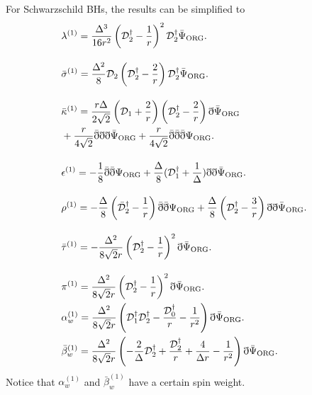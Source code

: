\documentclass[aps,prd,amsmath,floats,floatfix, twocolumn,
superscriptaddress,nofootinbib,showpacs]{revtex4-1}
\newcommand{\hertz}{\Psi_{\rm ORG}}
\newcommand{\hertzbar}{\bar{\Psi}_{\rm ORG}}
\begin{document}
For Schwarzschild BHs, the results can be simplified to
\begin{align}
    &\lambda^{(1)}= \frac{\Delta^3}{16r^2}\left(\mathcal{D}_2^\dagger -\frac{1}{r}\right)^2 \mathcal{D}_2^\dagger\hertzbar. \\[10pt]
    &\bar{\sigma}^{(1)}=\frac{\Delta^2}{8}\mathcal{D}_2\left(\mathcal{D}_2^\dagger -\frac{2}{r}\right) \mathcal{D}_2^\dagger\hertzbar. \\[10pt]
    &\bar{\kappa}^{(1)} =  \frac{r\Delta}{2\sqrt{2}} 
    \left(\mathcal{D}_1+\frac{2}{r}\right)\left(\mathcal{D}_2^\dagger -\frac{2}{r}\right)\eth\hertzbar \notag \\
    &+ \frac{r}{4\sqrt{2}}\bar{\eth}\eth\eth\hertzbar+\frac{r}{4\sqrt{2}}\bar{\eth}\bar{\eth}\bar{\eth}\hertz. \\[10pt]
    &\epsilon^{(1)}=-\frac{1}{8}\bar{\eth}\bar{\eth}\hertz+\frac{\Delta}{8} (\mathcal{D}_1^\dagger+\frac{1}{\Delta})\eth\eth\hertzbar. \\[10pt]
   &\rho^{(1)} = -\frac{\Delta}{8}\left(\bar{\mathcal{D}}_2^\dagger -\frac{1}{r}\right)\bar{\eth}\bar{\eth}\hertz+\frac{\Delta}{8}\left(\mathcal{D}_2^\dagger -\frac{3}{r}\right)\eth\eth\hertzbar. \\[10pt]
   &\bar{\tau}^{(1)}=-\frac{\Delta^2}{8\sqrt{2}r}\left(\mathcal{D}_2^\dagger -\frac{1}{r}\right)^2\eth\hertzbar. \\[10pt]
   &\pi^{(1)}=\frac{\Delta^2}{8\sqrt{2}r}\left(\mathcal{D}_2^\dagger -\frac{1}{r}\right)^2\eth\hertzbar. \\
    &\alpha_w^{(1)}=\frac{\Delta^2}{8\sqrt{2}r}\left(\mathcal{D}_1^\dagger\mathcal{D}_2^\dagger-\frac{\mathcal{D}_0^\dagger}{r}-\frac{1}{r^2}\right)\eth\hertzbar. \\
    &\bar{\beta}_w^{(1)}=\frac{\Delta^2}{8\sqrt{2}r}\left(-\frac{2}{\Delta}\mathcal{D}^\dagger_2+ \frac{\mathcal{D}^\dagger_2}{r} +\frac{4}{\Delta r}- \frac{1}{r^2}
\right)\eth\hertzbar.
\end{align}
Notice that $\alpha_w^{(1)}$ and $\bar{\beta}_w^{(1)}$ have a certain spin weight.
\end{document}
